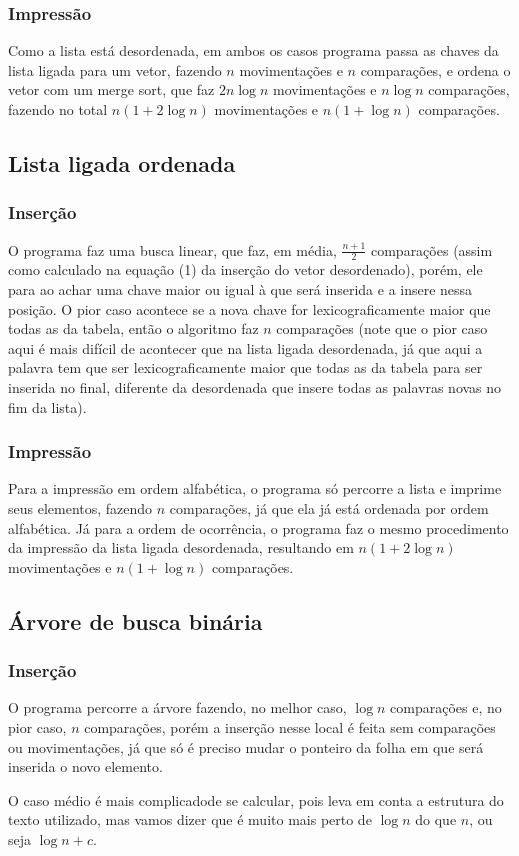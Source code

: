 \documentclass[12pt, a4paper]{article} %
\begin{document}
		\subsubsection{Impressão}
		\par Como a lista está desordenada, em ambos os casos programa passa as chaves da lista ligada para um vetor, fazendo $n$ movimentações e $n$ comparações, e ordena o vetor com um merge sort, que faz $2n\log n$ movimentações e $n\log n$ comparações, fazendo no total $n(1+2\log n)$ movimentações e $n(1+\log n)$ comparações.

	\subsection{Lista ligada ordenada}
		\subsubsection{Inserção}
		\par O programa faz uma busca linear, que faz, em média, $\frac{n+1}{2}$ comparações (assim como calculado na equação (1) da inserção do vetor desordenado), porém, ele para ao achar uma chave maior ou igual à que será inserida e a insere nessa posição. O pior caso acontece se a nova chave for lexicograficamente maior que todas as da tabela, então o algoritmo faz $n$ comparações (note que o pior caso aqui é mais difícil de acontecer que na lista ligada desordenada, já que aqui a palavra tem que ser lexicograficamente maior que todas as da tabela para ser inserida no final, diferente da desordenada que insere todas as palavras novas no fim da lista).
		\subsubsection{Impressão}
		\par Para a impressão em ordem alfabética, o programa só percorre a lista e imprime seus elementos, fazendo $n$ comparações, já que ela já está ordenada por ordem alfabética. Já para a ordem de ocorrência, o programa faz o mesmo procedimento da impressão da lista ligada desordenada, resultando em $n(1+2\log n)$ movimentações e $n(1+\log n)$ comparações.

	\subsection{Árvore de busca binária}
		\subsubsection{Inserção}
		\par O programa percorre a árvore fazendo, no melhor caso, $\log n$ comparações e, no pior caso, $n$ comparações, porém a inserção nesse local é feita sem comparações ou movimentações, já que só é preciso mudar o ponteiro da folha em que será inserida o novo elemento.
		\par O caso médio é mais complicadode se calcular, pois leva em conta a estrutura do texto utilizado, mas vamos dizer que é muito mais perto de $\log n$ do que $n$, ou seja $\log n + c$.
\end{document}
